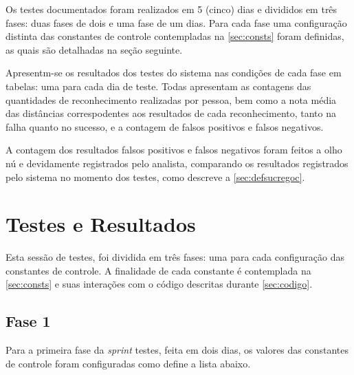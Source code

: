 Os testes documentados foram realizados em 5 (cinco) dias e divididos em três fases: duas fases de dois e uma fase de um dias. Para cada fase uma configuração distinta das constantes de controle contempladas na \autoref{sec:consts} foram definidas, as quais são detalhadas na seção seguinte.

Apresentm-se os resultados dos testes do sistema nas condições de cada fase em tabelas: uma para cada dia de teste. Todas apresentam as contagens das quantidades de reconhecimento realizadas por pessoa, bem como a nota média das distâncias correspodentes aos resultados de cada reconhecimento, tanto na falha quanto no sucesso, e a contagem de falsos positivos e falsos negativos.

A contagem dos resultados falsos positivos e falsos negativos foram feitos a olho nú e devidamente registrados pelo analista, comparando os resultados registrados pelo sistema no momento dos testes, como descreve a \autoref{sec:defsucregoc}.

\section{Testes e Resultados}\label{ch:testresult}

Esta sessão de testes, foi dividida em três fases: uma para cada configuração das constantes de controle. A finalidade de cada constante é contemplada na \autoref{sec:consts} e suas interações com o código descritas durante \autoref{sec:codigo}.


\subsection{Fase 1}\label{ch:testresultfaz1}
Para a primeira fase da \textit{sprint} testes, feita em dois dias, os valores das constantes de controle foram configuradas como define a lista abaixo.

